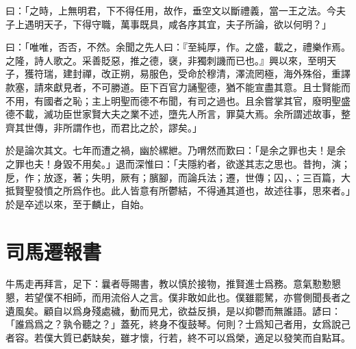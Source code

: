 曰：「之時，上無明君，下不得任用，故作，垂空文以斷禮義，當一王之法。今夫子上遇明天子，下得守職，萬事既具，咸各序其宜，夫子所論，欲以何明？」

曰：「唯唯，否否，不然。余聞之先人曰：『至純厚，作。之盛，載之，禮樂作焉。之隆，詩人歌之。采善貶惡，推之德，襃，非獨刺譏而已也。』興以來，至明天子，獲符瑞，建封禪，改正朔，易服色，受命於穆清，澤流罔極，海外殊俗，重譯款塞，請來獻見者，不可勝道。臣下百官力誦聖德，猶不能宣盡其意。且士賢能而不用，有國者之恥；主上明聖而德不布聞，有司之過也。且余嘗掌其官，廢明聖盛德不載，滅功臣世家賢大夫之業不述，墮先人所言，罪莫大焉。余所謂述故事，整齊其世傳，非所謂作也，而君比之於，謬矣。」

於是論次其文。七年而遭之禍，幽於縲紲。乃喟然而歎曰：「是余之罪也夫！是余之罪也夫！身毀不用矣。」退而深惟曰：「夫隱約者，欲遂其志之思也。昔拘，演；戹，作；放逐，著；失明，厥有；臏腳，而論兵法；遷，世傳；囚，、；三百篇，大抵賢聖發憤之所爲作也。此人皆意有所鬱結，不得通其道也，故述往事，思來者。」於是卒述以來，至于麟止，自始。

\theendnotes

\section[報任安書\quad{\small 司馬遷}]{{\normalsize 司馬遷}\quad 報書}
牛馬走再拜言，足下：曩者辱賜書，教以慎於接物，推賢進士爲務。意氣懃懃懇懇，若望僕不相師，而用流俗人之言。僕非敢如此也。僕雖罷駑，亦嘗側聞長者之遺風矣。顧自以爲身殘處穢，動而見尤，欲益反損，是以抑鬱而無誰語。諺曰：「誰爲爲之？孰令聽之？」蓋死，終身不復鼓琴。何則？士爲知己者用，女爲說己者容。若僕大質已虧缺矣，雖才懷，行若，終不可以爲榮，適足以發笑而自點耳。

